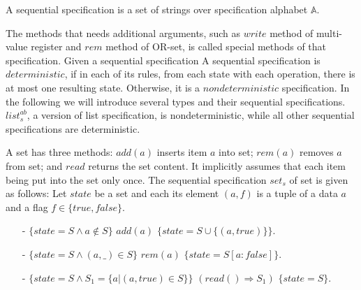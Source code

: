 \begin{definition}
\label{definition:sequential specification}
A sequential specification is a set of strings over specification alphabet $\mathbb{A}$.
\end{definition}

The methods that needs additional arguments, such as $\mathit{write}$ method of multi-value register and $\mathit{rem}$ method of OR-set, is called special methods of that specification. Given a sequential specification  A sequential specification is $\mathit{deterministic}$, if in each of its rules, from each state with each operation, there is at most one resulting state. Otherwise, it is a $\mathit{nondeterministic}$ specification. In the following we will introduce several types and their sequential specifications. $\mathit{list}_s^{\mathit{ab}}$, a version of list specification, is nondeterministic, while all other sequential specifications are deterministic.


\begin{example}
\label{definition:sequential specification of set}
A set has three methods: $\mathit{add}(a)$ inserts item $a$ into set; $\mathit{rem}(a)$ removes $a$ from set; and $\mathit{read}$ returns the set content. It implicitly assumes that each item being put into the set only once. The sequential specification $\mathit{set}_s$ of set is given as follows:  Let $\mathit{state}$ be a set and each its element $(a,f)$ is a tuple of a data $a$ and a flag $f \in \{ \mathit{true},\mathit{false} \}$.

\begin{itemize}
\setlength{\itemsep}{0.5pt}
\item[-] $\{ \mathit{state} = S \wedge a \notin S \}$ $\mathit{add}(a)$ $\{ \mathit{state} = S \cup \{ (a,\mathit{true}) \} \}$.
\item[-] $\{ \mathit{state} = S \wedge (a,\_) \in S \}$ $\mathit{rem}(a)$ $\{ \mathit{state} = S[a:\mathit{false}] \}$.
\item[-] $\{ \mathit{state} = S \wedge S_1 = \{a \vert (a,\mathit{true}) \in S \} \}$ $(\mathit{read}() \Rightarrow S_1)$ $\{ \mathit{state} = S \}$.
\end{itemize}
\end{example}



